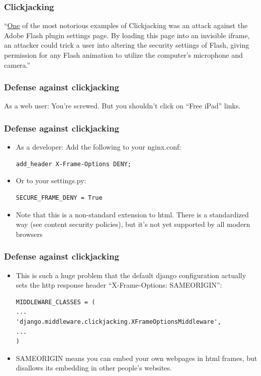 \documentclass[9pt]{beamer}
\begin{document}
\begin{frame}[fragile]
\frametitle{Clickjacking}
``\href{https://www.owasp.org/index.php/Clickjacking}{One} of the most notorious examples of Clickjacking was an attack against the Adobe Flash plugin settings page. By loading this page into an invisible iframe, an attacker could trick a user into altering the security settings of Flash, giving permission for any Flash animation to utilize the computer's microphone and camera.''
\end{frame}

\begin{frame}[fragile]
\frametitle{Defense against clickjacking}
As a web user: You're screwed. But you shouldn't click on ``Free iPad'' links.
\end{frame}

\begin{frame}[fragile]
\frametitle{Defense against clickjacking}
\begin{itemize}
\item As a developer: Add the following to your nginx.conf:
\begin{verbatim}
add_header X-Frame-Options DENY;
\end{verbatim}
\pause
\item Or to your settings.py:
\begin{verbatim}
SECURE_FRAME_DENY = True
\end{verbatim}
\pause
\item Note that this is a non-standard extension to html. There is a standardized way (see content security policies), but it's not yet supported by all modern browsers
\end{itemize}
\end{frame}

\begin{frame}[fragile]
\frametitle{Defense against clickjacking}
\begin{itemize}
\item This is such a huge problem that the default django configuration actually sets the http response header ``X-Frame-Options: SAMEORIGIN'':
\begin{verbatim}
MIDDLEWARE_CLASSES = (
...
'django.middleware.clickjacking.XFrameOptionsMiddleware',
...
)
\end{verbatim}
\pause
\item SAMEORIGIN means you can embed your own webpages in html frames, but disallows its embedding in other people's websites.
\end{itemize}
\end{frame}
\end{document}
